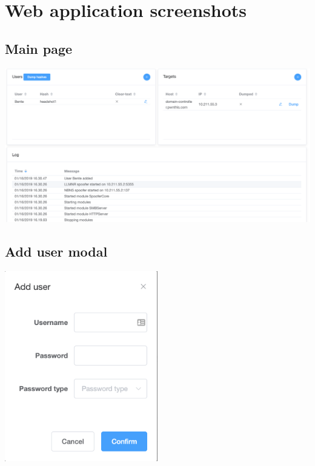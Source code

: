 \documentclass{article}
\begin{document}
\section{Web application screenshots}
\subsection{Main page}
\label{appendix:web-ui}
\includegraphics[width=\textwidth]{figures/web-ui.png}

\subsection{Add user modal}
\label{appendix:add-user-modal}
\begin{center}
    \includegraphics[width=0.5\textwidth]{figures/add-user-modal.png}
\end{center}
\end{document}
